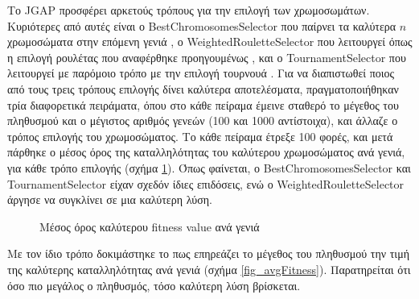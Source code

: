 Το JGAP προσφέρει αρκετούς τρόπους για την επιλογή των χρωμοσωμάτων. Κυριότερες από αυτές είναι ο BestChromosomesSelector που παίρνει τα καλύτερα $n$ χρωμοσώματα στην επόμενη γενιά \cite{BCS}, ο WeightedRouletteSelector που λειτουργεί όπως η επιλογή ρουλέτας που αναφέρθηκε προηγουμένως \cite{WRS}, και ο TournamentSelector που λειτουργεί με παρόμοιο τρόπο με την επιλογή τουρνουά \cite{TS}. Για να διαπιστωθεί ποιος από τους τρεις τρόπους επιλογής δίνει καλύτερα αποτελέσματα, πραγματοποιήθηκαν τρία διαφορετικά πειράματα, όπου στο κάθε πείραμα έμεινε σταθερό το μέγεθος του πληθυσμού και ο μέγιστος αριθμός γενεών (100 και 1000 αντίστοιχα), και άλλαζε ο τρόπος επιλογής του χρωμοσώματος. Το κάθε πείραμα έτρεξε 100 φορές, και μετά πάρθηκε ο μέσος όρος της καταλληλότητας του καλύτερου χρωμοσώματος ανά γενιά, για κάθε τρόπο επιλογής (σχήμα \ref{fig_selectorFitness}). Όπως φαίνεται, ο BestChromosomesSelector και TournamentSelector είχαν σχεδόν ίδιες επιδόσεις, ενώ ο WeightedRouletteSelector άργησε να συγκλίνει σε μια καλύτερη λύση.

\begin{figure}[!t]
    \centering
    \caption{Μέσος όρος καλύτερου fitness value ανά γενιά}
    \label{fig_selectorFitness}
\end{figure}

Με τον ίδιο τρόπο δοκιμάστηκε το πως επηρεάζει το μέγεθος του πληθυσμού την τιμή της καλύτερης καταλληλότητας ανά γενιά (σχήμα \ref{fig_avgFitness}). Παρατηρείται ότι όσο πιο μεγάλος ο πληθυσμός, τόσο καλύτερη λύση βρίσκεται.

